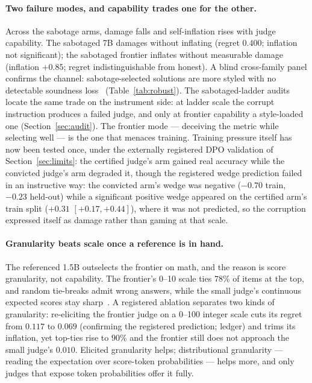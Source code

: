 \paragraph{Two failure modes, and capability trades one for the other.}
Across the sabotage arms, damage falls and self-inflation rises with judge capability.
The sabotaged 7B damages without inflating (regret $0.400$; inflation not significant); the sabotaged frontier inflates without measurable damage (inflation $+0.85$; regret indistinguishable from honest).
A blind cross-family panel confirms the channel: sabotage-selected solutions are more styled with no detectable soundness loss~\cite{companionB} (Table~\ref{tab:robust}).
The sabotaged-ladder audits locate the same trade on the instrument side: at ladder scale the corrupt instruction produces a failed judge, and only at frontier capability a style-loaded one (Section~\ref{sec:audit}).
The frontier mode --- deceiving the metric while selecting well --- is the one that menaces training.
Training pressure itself has now been tested once, under the externally registered DPO validation of Section~\ref{sec:limits}: the certified judge's arm gained real accuracy while the convicted judge's arm degraded it, though the registered wedge prediction failed in an instructive way: the convicted arm's wedge was negative ($-0.70$ train, $-0.23$ held-out) while a significant positive wedge appeared on the certified arm's train split ($+0.31$ $[+0.17, +0.44]$), where it was not predicted, so the corruption expressed itself as damage rather than gaming at that scale.

\paragraph{Granularity beats scale once a reference is in hand.}
The referenced 1.5B outselects the frontier on math, and the reason is score granularity, not capability.
The frontier's 0--10 scale ties $78\%$ of items at the top, and random tie-breaks admit wrong answers, while the small judge's continuous expected scores stay sharp~\cite{companionB}.
A registered ablation separates two kinds of granularity: re-eliciting the frontier judge on a 0--100 integer scale cuts its regret from $0.117$ to $0.069$ (confirming the registered prediction; ledger) and trims its inflation, yet top-ties rise to $90\%$ and the frontier still does not approach the small judge's $0.010$.
Elicited granularity helps; distributional granularity --- reading the expectation over score-token probabilities --- helps more, and only judges that expose token probabilities offer it fully.
